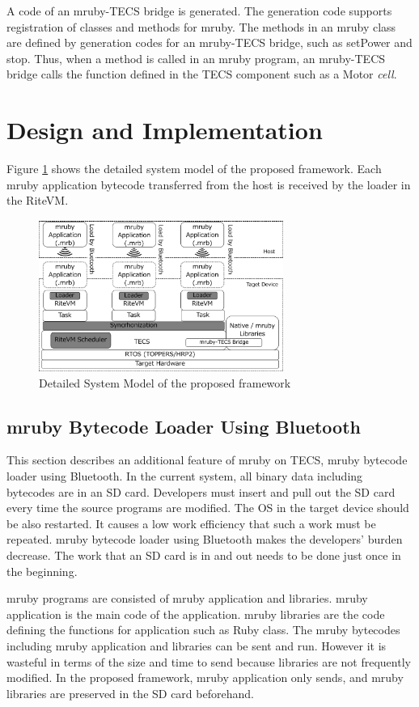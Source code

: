 \documentclass[conference,compsoc]{IEEEtran}
\begin{document}
A code of an mruby-TECS bridge is generated.
The generation code supports registration of classes and methods for mruby.
The methods in an mruby class are defined by generation codes for an mruby-TECS bridge, such as setPower and stop.
Thus, when a method is called in an mruby program, an mruby-TECS bridge calls the function defined in the TECS component such as a Motor {\it cell}.

 
\section{Design and Implementation}
\label{sec:Design and Implementation}
Figure \ref{fig:system_model} shows the detailed system model of the proposed framework.
Each mruby application bytecode transferred from the host is received by the loader in the RiteVM.

\begin{figure}[t]
    \centering
    \includegraphics[width=8cm,clip]{figure/system_model.pdf}
    \caption{Detailed System Model of the proposed framework}
    \label{fig:system_model}
\end{figure}
\subsection{mruby Bytecode Loader Using Bluetooth}
\label{sec:mruby bytecode loader using Bluetooth}
This section describes an additional feature of mruby on TECS, mruby bytecode loader using Bluetooth.
In the current system, all binary data including bytecodes are in an SD card.
Developers must insert and pull out the SD card every time the source programs are modified.
The OS in the target device should be also restarted.
It causes a low work efficiency that such a work must be repeated.
mruby bytecode loader using Bluetooth makes the developers' burden decrease.
The work that an SD card is in and out needs to be done just once in the beginning.

mruby programs are consisted of mruby application and libraries.
mruby application is the main code of the application.
mruby libraries are the code defining the functions for application such as Ruby class. 
The mruby bytecodes including mruby application and libraries can be sent and run.
However it is wasteful in terms of the size and time to send because libraries are not frequently modified. 
In the proposed framework, mruby application only sends, and mruby libraries are preserved in the SD card beforehand.
\end{document}
